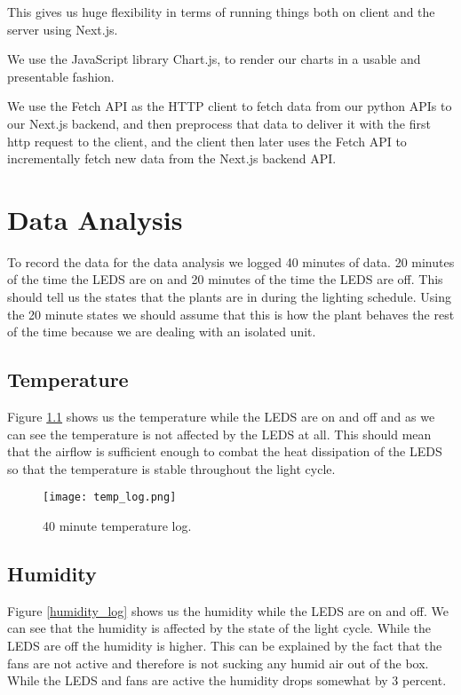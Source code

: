 \documentclass[a4paper,12pt,twoside,openright,titlepage]{book}
\begin{document}
This gives us huge flexibility in terms of running things both on client and the server using Next.js.

We use the JavaScript library Chart.js, to render our charts in a usable and presentable fashion.

We use the Fetch API as the HTTP client to fetch data from our python APIs to our Next.js backend, and then preprocess that data to deliver it with the first http request to the client, and the client then later uses the Fetch API to incrementally fetch new data from the Next.js backend API.


\chapter{Data Analysis}
To record the data for the data analysis we logged 40 minutes of data. 20 minutes of the time the LEDS are on and 20 minutes of the time the LEDS are off. This should tell us the states that the plants are in during the lighting schedule. Using the 20 minute states we should assume that this is how the plant behaves the rest of the time because we are dealing with an isolated unit.

\section{Temperature}
Figure \ref{temp_log} shows us the temperature while the LEDS are on and off and as we can see the temperature is not affected by the LEDS at all. This should mean that the airflow is sufficient enough to combat the heat dissipation of the LEDS so that the temperature is stable throughout the light cycle.

\begin{figure}[h]
    \begin{center}
        \label{temp_log}
        \texttt{[image: temp\_log.png]}
        \caption{40 minute temperature log.}
    \end{center}
\end{figure}

\section{Humidity}
Figure \ref{humidity_log} shows us the humidity while the LEDS are on and off. We can see that the humidity is affected by the state of the light cycle. While the LEDS are off the humidity is higher. This can be explained by the fact that the fans are not active and therefore is not sucking any humid air out of the box. While the LEDS and fans are active the humidity drops somewhat by 3 percent.
\end{document}
